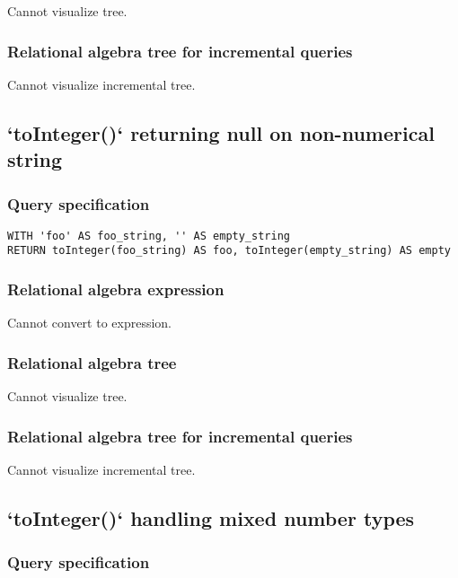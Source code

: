 Cannot visualize tree.

\subsubsection*{Relational algebra tree for incremental queries}

Cannot visualize incremental tree.

\subsection{`toInteger()` returning null on non-numerical string}

\subsubsection*{Query specification}

\begin{lstlisting}
WITH 'foo' AS foo_string, '' AS empty_string
RETURN toInteger(foo_string) AS foo, toInteger(empty_string) AS empty
\end{lstlisting}

\subsubsection*{Relational algebra expression}

Cannot convert to expression.

\subsubsection*{Relational algebra tree}

Cannot visualize tree.

\subsubsection*{Relational algebra tree for incremental queries}

Cannot visualize incremental tree.

\subsection{`toInteger()` handling mixed number types}

\subsubsection*{Query specification}

